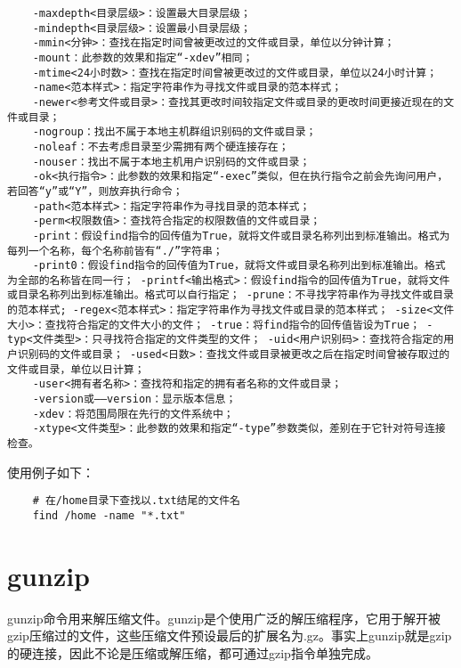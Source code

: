 \documentclass[a4paper,left=2.5cm,right=2.5cm,11pt]{article}
\begin{document}
\begin{lstlisting}
	-maxdepth<目录层级>：设置最大目录层级； 
	-mindepth<目录层级>：设置最小目录层级； 
	-mmin<分钟>：查找在指定时间曾被更改过的文件或目录，单位以分钟计算； 
	-mount：此参数的效果和指定“-xdev”相同； 
	-mtime<24小时数>：查找在指定时间曾被更改过的文件或目录，单位以24小时计算； 
	-name<范本样式>：指定字符串作为寻找文件或目录的范本样式； 
	-newer<参考文件或目录>：查找其更改时间较指定文件或目录的更改时间更接近现在的文件或目录； 
	-nogroup：找出不属于本地主机群组识别码的文件或目录； 
	-noleaf：不去考虑目录至少需拥有两个硬连接存在； 
	-nouser：找出不属于本地主机用户识别码的文件或目录； 
	-ok<执行指令>：此参数的效果和指定“-exec”类似，但在执行指令之前会先询问用户，若回答“y”或“Y”，则放弃执行命令； 
	-path<范本样式>：指定字符串作为寻找目录的范本样式； 
	-perm<权限数值>：查找符合指定的权限数值的文件或目录； 
	-print：假设find指令的回传值为True，就将文件或目录名称列出到标准输出。格式为每列一个名称，每个名称前皆有“./”字符串； 
	-print0：假设find指令的回传值为True，就将文件或目录名称列出到标准输出。格式为全部的名称皆在同一行； -printf<输出格式>：假设find指令的回传值为True，就将文件或目录名称列出到标准输出。格式可以自行指定； -prune：不寻找字符串作为寻找文件或目录的范本样式; -regex<范本样式>：指定字符串作为寻找文件或目录的范本样式； -size<文件大小>：查找符合指定的文件大小的文件； -true：将find指令的回传值皆设为True； -typ<文件类型>：只寻找符合指定的文件类型的文件； -uid<用户识别码>：查找符合指定的用户识别码的文件或目录； -used<日数>：查找文件或目录被更改之后在指定时间曾被存取过的文件或目录，单位以日计算； 
	-user<拥有者名称>：查找符和指定的拥有者名称的文件或目录； 
	-version或——version：显示版本信息； 
	-xdev：将范围局限在先行的文件系统中； 
	-xtype<文件类型>：此参数的效果和指定“-type”参数类似，差别在于它针对符号连接检查。
	\end{lstlisting}

	使用例子如下：
	\begin{lstlisting}
	# 在/home目录下查找以.txt结尾的文件名
	find /home -name "*.txt"
	\end{lstlisting}

\section{gunzip}
	gunzip命令用来解压缩文件。gunzip是个使用广泛的解压缩程序，它用于解开被gzip压缩过的文件，这些压缩文件预设最后的扩展名为.gz。事实上gunzip就是gzip的硬连接，因此不论是压缩或解压缩，都可通过gzip指令单独完成。\par
\end{document}
